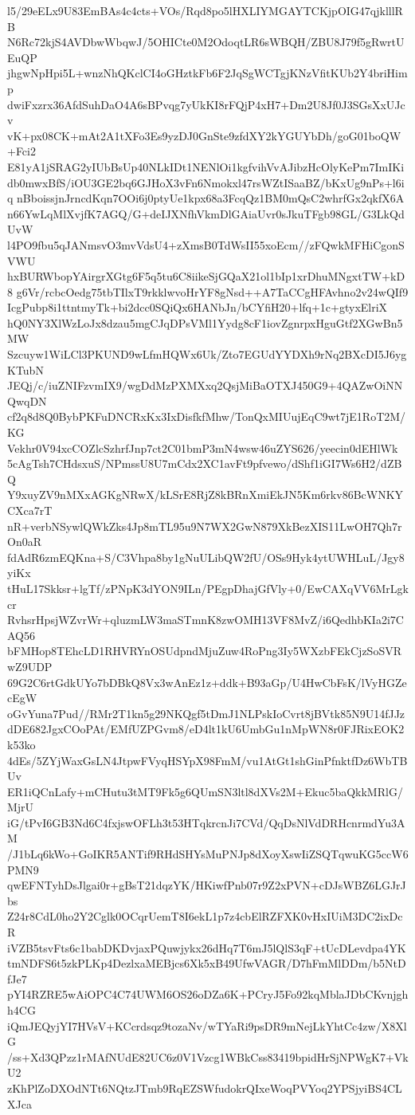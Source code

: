 l5/29eELx9U83EmBAs4c4cts+VOs/Rqd8po5lHXLIYMGAYTCKjpOIG47qjklllRB
N6Rc72kjS4AVDbwWbqwJ/5OHICte0M2OdoqtLR6sWBQH/ZBU8J79f5gRwrtUEuQP
jhgwNpHpi5L+wnzNhQKclCI4oGHztkFb6F2JqSgWCTgjKNzVfitKUb2Y4briHimp
dwiFxzrx36AfdSuhDaO4A6sBPvqg7yUkKI8rFQjP4xH7+Dm2U8Jf0J3SGsXxUJcv
vK+px08CK+mAt2A1tXFo3Es9yzDJ0GnSte9zfdXY2kYGUYbDh/goG01boQW+Fci2
E81yA1jSRAG2yIUbBsUp40NLkIDt1NENlOi1kgfvihVvAJibzHcOlyKePm7ImIKi
db0mwxBfS/iOU3GE2bq6GJHoX3vFn6Nmokxl47rsWZtISaaBZ/bKxUg9nPs+l6iq
nBboissjnJrncdKqn7OOi6j0ptyUe1kpx68a3FcqQz1BM0mQsC2whrfGx2qkfX6A
n66YwLqMlXvjfK7AGQ/G+deIJXNfhVkmDlGAiaUvr0sJkuTFgb98GL/G3LkQdUvW
l4PO9fbu5qJANmsvO3mvVdsU4+zXmsB0TdWsII55xoEcm//zFQwkMFHiCgonSVWU
hxBURWbopYAirgrXGtg6F5q5tu6C8iikeSjGQaX21ol1bIp1xrDhuMNgxtTW+kD8
g6Vr/rcbcOedg75tbTIlxT9rkklwvoHrYF8gNsd++A7TaCCgHFAvhno2v24wQIf9
IcgPubp8i1ttntmyTk+bi2dcc0SQiQx6HANbJn/bCYfiH20+lfq+1c+gtyxElriX
hQ0NY3XlWzLoJx8dzau5mgCJqDPsVMl1Yydg8cF1iovZgnrpxHguGtf2XGwBn5MW
Szcuyw1WiLCl3PKUND9wLfmHQWx6Uk/Zto7EGUdYYDXh9rNq2BXcDI5J6ygKTubN
JEQj/c/iuZNIFzvmIX9/wgDdMzPXMXxq2QsjMiBaOTXJ450G9+4QAZwOiNNQwqDN
cf2q8d8Q0BybPKFuDNCRxKx3IxDisfkfMhw/TonQxMIUujEqC9wt7jE1RoT2M/KG
Vekhr0V94xcCOZlcSzhrfJnp7ct2C01bmP3mN4wsw46uZYS626/yeecin0dEHlWk
5cAgTsh7CHdsxuS/NPmssU8U7mCdx2XC1avFt9pfvewo/dShf1iGI7Ws6H2/dZBQ
Y9xuyZV9nMXxAGKgNRwX/kLSrE8RjZ8kBRnXmiEkJN5Km6rkv86BcWNKYCXca7rT
nR+verbNSywlQWkZks4Jp8mTL95u9N7WX2GwN879XkBezXIS11LwOH7Qh7rOn0aR
fdAdR6zmEQKna+S/C3Vhpa8by1gNuULibQW2fU/OSs9Hyk4ytUWHLuL/Jgy8yiKx
tHuL17Skksr+lgTf/zPNpK3dYON9ILn/PEgpDhajGfVly+0/EwCAXqVV6MrLgkcr
RvhsrHpsjWZvrWr+qluzmLW3maSTmnK8zwOMH13VF8MvZ/i6QedhbKIa2i7CAQ56
bFMHop8TEhcLD1RHVRYnOSUdpndMjuZuw4RoPng3Iy5WXzbFEkCjzSoSVRwZ9UDP
69G2C6rtGdkUYo7bDBkQ8Vx3wAnEz1z+ddk+B93aGp/U4HwCbFsK/lVyHGZecEgW
oGvYuna7Pud//RMr2T1kn5g29NKQgf5tDmJ1NLPskIoCvrt8jBVtk85N9U14fJJz
dDE682JgxCOoPAt/EMfUZPGvm8/eD4lt1kU6UmbGu1nMpWN8r0FJRixEOK2k53ko
4dEs/5ZYjWaxGsLN4JtpwFVyqHSYpX98FmM/vu1AtGt1shGinPfnktfDz6WbTBUv
ER1iQCnLafy+mCHutu3tMT9Fk5g6QUmSN3ltl8dXVs2M+Ekuc5baQkkMRlG/MjrU
iG/tPvI6GB3Nd6C4fxjswOFLh3t53HTqkrcnJi7CVd/QqDsNlVdDRHcnrmdYu3AM
/J1bLq6kWo+GoIKR5ANTif9RHdSHYsMuPNJp8dXoyXswIiZSQTqwuKG5ccW6PMN9
qwEFNTyhDsJlgai0r+gBsT21dqzYK/HKiwfPnb07r9Z2xPVN+cDJsWBZ6LGJrJbs
Z24r8CdL0ho2Y2Cglk0OCqrUemT8I6ekL1p7z4cbElRZFXK0vHxIUiM3DC2ixDcR
iVZB5tsvFts6c1babDKDvjaxPQuwjykx26dHq7T6mJ5lQlS3qF+tUcDLevdpa4YK
tmNDFS6t5zkPLKp4DezlxaMEBjcs6Xk5xB49UfwVAGR/D7hFmMlDDm/b5NtDfJe7
pYI4RZRE5wAiOPC4C74UWM6OS26oDZa6K+PCryJ5Fo92kqMblaJDbCKvnjghh4CG
iQmJEQyjYI7HVsV+KCcrdsqz9tozaNv/wTYaRi9psDR9mNejLkYhtCc4zw/X8XlG
/ss+Xd3QPzz1rMAfNUdE82UC6z0V1Vzcg1WBkCss83419bpidHrSjNPWgK7+VkU2
zKhPlZoDXOdNTt6NQtzJTmb9RqEZSWfudokrQIxeWoqPVYoq2YPSjyiBS4CLXJca
